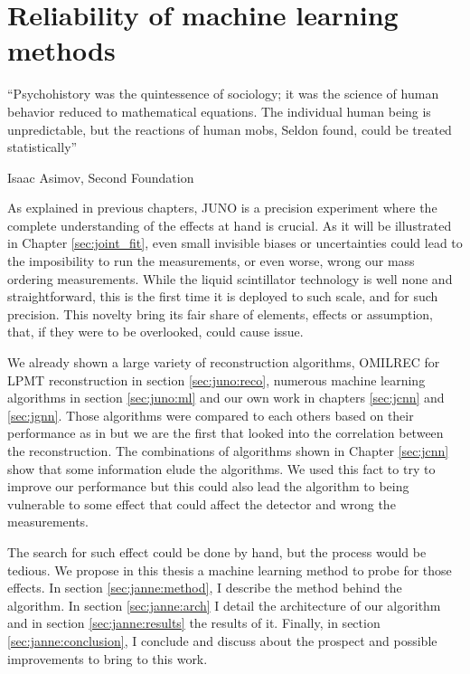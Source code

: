 \documentclass[../main.tex]{subfiles}
\begin{document}
\chapter{Reliability of machine learning methods}
\label{sec:janne}

\epigraph{``Psychohistory was the quintessence of sociology; it was the science of human behavior reduced to mathematical equations. The individual human being is unpredictable, but the reactions of human mobs, Seldon found, could be treated statistically''}{Isaac Asimov, Second Foundation}

\minitoc

As explained in previous chapters, JUNO is a precision experiment where the complete understanding of the effects at hand is crucial. As it will be illustrated in Chapter \ref{sec:joint_fit}, even small invisible biases or uncertainties could lead to the imposibility to run the measurements, or even worse, wrong our mass ordering measurements. While the liquid scintillator technology is well none and straightforward, this is the first time it is deployed to such scale, and for such precision. This novelty bring its fair share of elements, effects or assumption, that, if they were to be overlooked, could cause issue.

We already shown a large variety of reconstruction algorithms, OMILREC for LPMT reconstruction in section \ref{sec:juno:reco}, numerous machine learning algorithms in section \ref{sec:juno:ml} and our own work in chapters \ref{sec:jcnn} and \ref{sec:jgnn}. Those algorithms were compared to each others based on their performance as in \cite{qian_vertex_2021} but we are the first that looked into the correlation between the reconstruction. The combinations of algorithms shown in Chapter \ref{sec:jcnn} show that some information elude the algorithms. We used this fact to try to improve our performance but this could also lead the algorithm to being vulnerable to some effect that could affect the detector and wrong the measurements.

The search for such effect could be done by hand, but the process would be tedious. We propose in this thesis a machine learning method to probe for those effects.  In section \ref{sec:janne:method}, I describe the method behind the algorithm. In section \ref{sec:janne:arch} I detail the architecture of our algorithm and in section \ref{sec:janne:results} the results of it. Finally, in section \ref{sec:janne:conclusion}, I conclude and discuss about the prospect and possible improvements to bring to this work.
\end{document}
